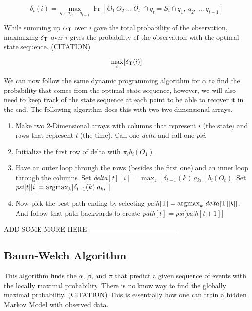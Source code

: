 \begin{equation}
  \delta_t(i) = \max_{q_1,\ q_2,\ \ldots\ q_{t-1}} \Pr[O_1\ O_2\ \ldots\
  O_t\ \cap q_t = S_i \cap q_1,\ q_2,\ \ldots\ q_{t-1}]
\end{equation}

While summing up $\alpha_{\mathrm{T}}$ over $i$ gave the total probability of the
observation, maximizing $\delta_{\mathrm{T}}$ over $i$ gives the probability of
the observation with the optimal state sequence. (CITATION)

\begin{equation}
  \max_i[\delta_{\mathrm{T}}(i)]
\end{equation}

We can now follow the same dynamic programming algorithm for $\alpha$ to
find the probability that comes from the optimal state sequence,
however, we will also need to keep track of the state sequence at each
point to be able to recover it in the end. The following algorithm does
this with two two dimensional arrays.

\begin{enumerate}
    \item Make two 2-Dimensional arrays with columns that
      represent $i$ (the state) and rows that represent $t$ (the time).
      Call one \emph{delta} and call one \emph{psi}.
    \item Initialize the first row of delta with $\pi_i b_i(O_1)$.
    \item Have an outer loop through the rows (besides the first one)
      and an inner loop through the columns. Set \emph{delta}$[t][i] =
      \max_k[\delta_{t-1}(k)\ a_{ki}\ ] b_i(O_t)$. Set \emph{psi}$[t][i]
      = \operatorname*{\arg\!\max}_k[\delta_{t-1}(k)\ a_{ki}\ ]$
    \item Now pick the best path ending by selecting \emph{path}$[\mathrm{T}] =
      \operatorname*{\arg\!\max}_k[\textrm{\emph{delta}}[\mathrm{T}][k]]$. And follow that path
      backwards to create \emph{path}$[t] =
      $\emph{psi}$[$\emph{path}$[t+1]]$
\end{enumerate}

ADD SOME MORE HERE-----------------------------------------

\subsection{Baum-Welch Algorithm}

This algorithm finds the $\alpha$, $\beta$, and $\pi$ that predict a
given sequence of events with the locally maximal probability. There is
no know way to find the globally maximal probability. (CITATION) This is
essentially how one can train a hidden Markov Model with observed data.

